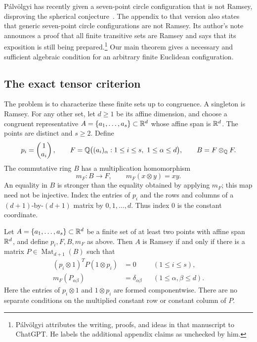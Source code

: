 P\'alv\"olgyi has recently given a seven-point circle configuration
that is not Ramsey, disproving the spherical
conjecture~\cite[Theorem~1]{palvolgyi-heptagon}.
The appendix to that version also states that generic seven-point circle
configurations are not Ramsey. Its author's note announces a proof that
all finite transitive sets are Ramsey and says that its exposition is
still being prepared.\footnote{P\'alv\"olgyi attributes the writing, proofs, and
ideas in that manuscript to ChatGPT. He labels the additional appendix
claims as unchecked by him.}
Our main theorem gives a necessary and sufficient algebraic condition
for an arbitrary finite Euclidean configuration.

\subsection{The exact tensor criterion}

The problem is to characterize these finite sets up to congruence.
A singleton is Ramsey. For any other set, let $d\ge1$ be its affine
dimension, and choose a congruent representative
$A=\{a_1,\ldots,a_s\}\subset\mathbb R^d$ whose affine span is $\mathbb R^d$.
The points are distinct and $s\ge2$. Define
\[
 p_i=\begin{pmatrix}1\\a_i\end{pmatrix},\qquad
 F=\mathbb Q\bigl((a_i)_\alpha:1\le i\le s,\ 1\le\alpha\le d\bigr),
 \qquad B=F\otimes_{\mathbb Q}F.
\]
The commutative ring $B$ has a multiplication homomorphism
\[
 m_F:B\longrightarrow F,\qquad m_F(x\otimes y)=xy.
\]
An equality in $B$ is stronger than the equality obtained by applying
$m_F$; this map need not be injective. Index the entries of $p_i$ and
the rows and columns of a $(d+1)$-by-$(d+1)$ matrix by $0,1,\ldots,d$.
Thus index $0$ is the constant coordinate.

\begin{theorem}[Classification]\label{thm:classification}
Let $A=\{a_1,\ldots,a_s\}\subset\mathbb R^d$ be a finite set of at least two
points with affine span $\mathbb R^d$, and define $p_i,F,B,m_F$ as above.
Then $A$ is Ramsey if and only if there is a matrix
$P\in\operatorname{Mat}_{d+1}(B)$ such that
\begin{align}
 (p_i\otimes1)^T P(1\otimes p_i)&=0
       &&(1\le i\le s),\label{eq:field-evaluations}\\
 m_F(P_{\alpha\beta})&=\delta_{\alpha\beta}
       &&(1\le\alpha,\beta\le d).\label{eq:field-spatial}
\end{align}
Here the entries of $p_i\otimes1$ and $1\otimes p_i$ are formed
componentwise. There are no separate conditions on the multiplied
constant row or constant column of $P$.
\end{theorem}

